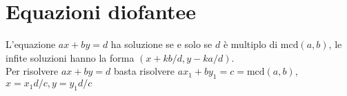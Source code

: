 \section{Equazioni diofantee}
L'equazione $ax + by = d$ ha soluzione se e solo se $d$ è multiplo di $\text{mcd}(a,b)$, le infite soluzioni hanno la forma $(x + kb/d,y - ka/d)$. \\
Per risolvere $ax + by = d$ basta risolvere $ax_1 + by_1 = c = \text{mcd}(a, b)$, $x = x_1d/c, y = y_1d/c$ \\